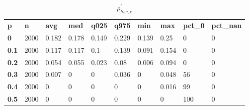 \begin{table}[h]
 \centering 
\footnotesize
\caption{$\rho_{hsc,c}^\prime $}
\label{tab:alphahscc}
\begin{tabular}[h]{| l l l l l l l l l l|
    } \hline
\textbf{ p} & \textbf{ n} & \textbf{ avg} & \textbf{ med} & \textbf{ q025} & \textbf{ q975} & \textbf{ min} & \textbf{ max} & \textbf{ pct\_0} & \textbf{ pct\_nan}
           \\
  \textbf{  0} & 2000 & 0.182 & 0.178 & 0.149 & 0.229 & 0.139 &  0.25 &   0 & 0
           \\
  \textbf{0.1} & 2000 & 0.117 & 0.117 &   0.1 & 0.139 & 0.091 & 0.154 &   0 & 0
           \\
  \textbf{0.2} & 2000 & 0.054 & 0.055 & 0.023 &  0.08 & 0.006 & 0.094 &   0 & 0
           \\
  \textbf{0.3} & 2000 & 0.007 &     0 &     0 & 0.036 &     0 & 0.048 &  56 & 0
           \\
  \textbf{0.4} & 2000 &     0 &     0 &     0 &     0 &     0 & 0.016 &  99 & 0
           \\
  \textbf{0.5} & 2000 &     0 &     0 &     0 &     0 &     0 &     0 & 100 & 0
           \\
 \hline \end{tabular}
 \end{table}
